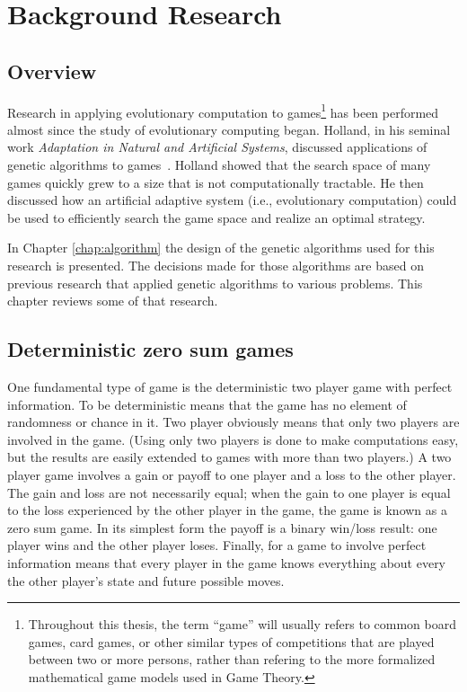 \clearpage
\chapter{Background Research}\label{chap:background}

\section{Overview}

Research in applying evolutionary computation to games\footnote{Throughout this
thesis, the term ``game'' will usually refers to common board games, card games,
or other similar types of competitions that are played between two or more
persons, rather than refering to the more formalized mathematical game models
used in Game Theory.} has been performed almost since the study of evolutionary
computing began. Holland, in his seminal work \emph{Adaptation in Natural and
Artificial Systems}, discussed applications of genetic algorithms to
games~\cite{holland1975adaptation,Holland1992}. Holland showed that the search
space of many games quickly grew to a size that is not computationally
tractable. He then discussed how an artificial adaptive system (i.e.,
evolutionary computation) could be used to efficiently search the game space and
realize an optimal strategy.

In Chapter \ref{chap:algorithm} the design of the genetic algorithms used for
this research is presented. The decisions made for those algorithms are based on
previous research that applied genetic algorithms to various problems. This
chapter reviews some of that research.

\section{Deterministic zero sum games}

One fundamental type of game is the deterministic two player game with perfect
information. To be deterministic means that the game has no element of
randomness or chance in it. Two player obviously means that only two players are
involved in the game. (Using only two players is done to make computations easy,
but the results are easily extended to games with more than two players.) A two
player game involves a gain or payoff to one player and a loss to the other
player. The gain and loss are not necessarily equal; when the gain to one player
is equal to the loss experienced by the other player in the game, the game is
known as a zero sum game. In its simplest form the payoff is a binary win/loss
result: one player wins and the other player loses. Finally, for a game to
involve perfect information means that every player in the game knows everything
about every the other player's state and future possible moves.

